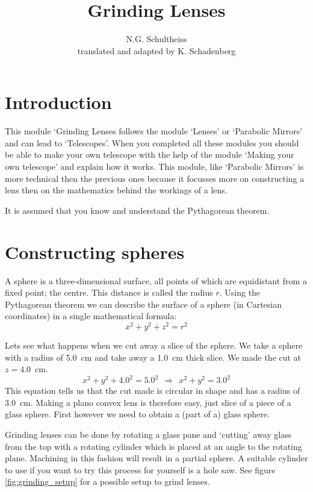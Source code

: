 


\author{N.G. Schultheiss \\ translated and adapted by K. Schadenberg}
\date{}
\title{Grinding Lenses}



\maketitle

\section{Introduction}
This module `Grinding Lenses follows the module `Lenses' or `Parabolic Mirrors' and can lead to `Telescopes'. When you completed all these modules you should be able to make your own telescope with the help of the module `Making your own telescope' and explain how it works. This module, like `Parabolic Mirrors' is more technical then the previous ones because it focusses more on constructing a lens then on the mathematics behind the workings of a lens.

It is assumed that you know and understand the Pythagorean theorem.

\section{Constructing spheres}
A sphere is a three-dimensional surface, all points of which are equidistant from a fixed point; the centre. This distance is called the radius $r$. Using the Pythagorean theorem we can describe the surface of a sphere (in Cartesian coordinates) in a single mathematical formula:
\begin{equation}
x^2 + y^2 + z^2 = r^2 \label{eq:sphere}
\end{equation}

Lets see what happens when we cut away a slice of the sphere. We take a sphere with a radius of 5.0~cm and take away a 1.0~cm thick slice. We made the cut at $z=4.0$~cm.
\begin{equation*}
x^2 + y^2 + 4.0^2 = 5.0^2 ~~\Rightarrow~~ x^2 + y^2 = 3.0^2
\end{equation*}
This equation tells us that the cut made is circular in shape and has a radius of 3.0~cm. Making a plano convex lens is therefore easy, just slice of a piece of a glass sphere. First however we need to obtain a (part of a) glass sphere.

Grinding lenses can be done by rotating a glass pane and `cutting' away glass from the top with a rotating cylinder which is placed at an angle to the rotating plane. Machining in this fashion will result in a partial sphere. A suitable cylinder to use if you want to try this process for yourself is a hole saw. See figure \ref{fig:grinding_setup} for a possible setup to grind lenses.

